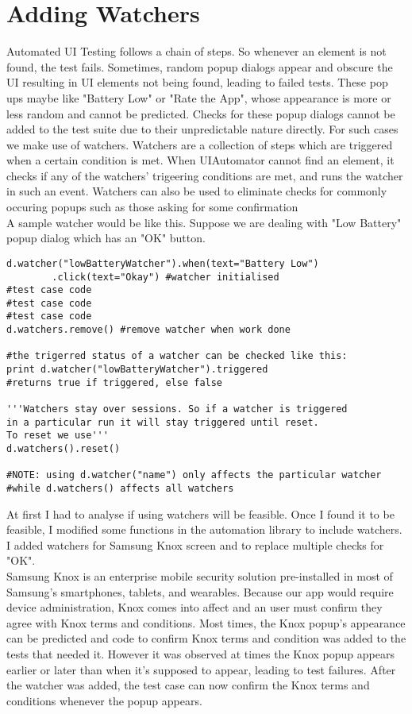 \section{Adding Watchers}
Automated UI Testing follows a chain of steps. So whenever an element is not found, the test fails. Sometimes, random popup dialogs appear and obscure the UI resulting in UI elements not being found, leading to failed tests. These pop ups maybe like "Battery Low" or "Rate the App", whose appearance is more or less random and cannot be predicted. Checks for these popup dialogs cannot be added to the test suite due to their unpredictable nature directly. For such cases we make use of watchers. Watchers are a collection of steps which are triggered when a certain condition is met. When UIAutomator cannot find an element, it checks if any of the watchers' trigeering conditions are met, and runs the watcher in such an event\cite{uiautomatordoc}. Watchers can also be used to eliminate checks for commonly occuring popups such as those asking for some confirmation\\

A sample watcher would be like this. Suppose we are dealing with "Low Battery" popup dialog which has an "OK" button.

\begin{lstlisting}[style=PyStyle]
d.watcher("lowBatteryWatcher").when(text="Battery Low")
		.click(text="Okay") #watcher initialised
#test case code
#test case code
#test case code
d.watchers.remove() #remove watcher when work done

#the trigerred status of a watcher can be checked like this:
print d.watcher("lowBatteryWatcher").triggered 
#returns true if triggered, else false

'''Watchers stay over sessions. So if a watcher is triggered 
in a particular run it will stay triggered until reset. 
To reset we use'''
d.watchers().reset()

#NOTE: using d.watcher("name") only affects the particular watcher 
#while d.watchers() affects all watchers
\end{lstlisting}

At first I had to analyse if using watchers will be feasible. Once I found it to be feasible, I modified some functions in the automation library to include watchers. I added watchers for Samsung Knox screen and to replace multiple checks for "OK".\\ 

Samsung Knox is an enterprise mobile security solution pre-installed in most of Samsung's smartphones, tablets, and wearables. Because our app would require device administration, Knox comes into affect and an user must confirm they agree with Knox terms and conditions. Most times, the Knox popup's appearance can be predicted and code to confirm Knox terms and condition was added to the tests that needed it. However it was observed at times the Knox popup appears earlier or later than when it's supposed to appear, leading to test failures. After the watcher was added, the test case can now confirm the Knox terms and conditions whenever the popup appears.\\

